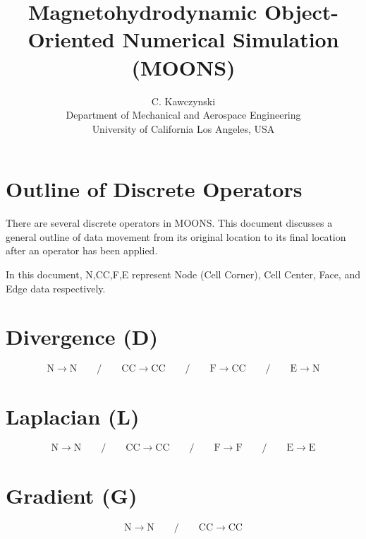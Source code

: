 \documentclass[11pt]{article}
\begin{document}
\doublespacing
\title{Magnetohydrodynamic Object-Oriented Numerical Simulation (MOONS)}
\author{C. Kawczynski \\
Department of Mechanical and Aerospace Engineering \\
University of California Los Angeles, USA\\
}
\maketitle

\section{Outline of Discrete Operators}

There are several discrete operators in MOONS. This document discusses a general outline of data movement from its original location to its final location after an operator has been applied.

In this document, N,CC,F,E represent Node (Cell Corner), Cell Center, Face, and Edge data respectively.

\section{Divergence (D)}

\begin{equation}
	\text{N} \rightarrow \text{N} 
	\qquad / \qquad 
	\text{CC} \rightarrow \text{CC}
	\qquad / \qquad 
	\text{F} \rightarrow \text{CC}
	\qquad / \qquad 
	\text{E} \rightarrow \text{N}
\end{equation}

\section{Laplacian (L)}

\begin{equation}
	\text{N} \rightarrow \text{N} 
	\qquad / \qquad 
	\text{CC} \rightarrow \text{CC}
	\qquad / \qquad 
	\text{F} \rightarrow \text{F}
	\qquad / \qquad 
	\text{E} \rightarrow \text{E}
\end{equation}

\section{Gradient (G)}

\begin{equation}
	\text{N} \rightarrow \text{N} 
	\qquad / \qquad 
	\text{CC} \rightarrow \text{CC}
\end{equation}
\end{document}
